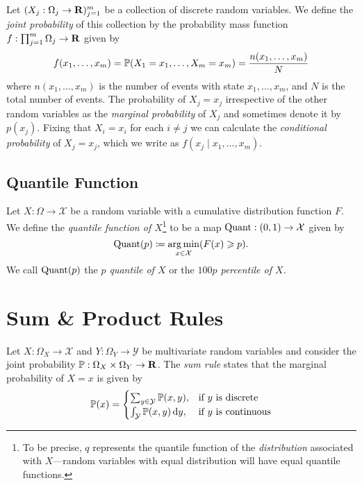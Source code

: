 \begin{definition}
    \label{def:joint-probability}
    Let \((X_j: \Omega_j \to \mathbf{R})_{j=1}^m\) be a collection of discrete random variables. We
    define the \emph{joint probability} of this collection by the probability mass
    function \(f: \prod_{j=1}^m \Omega_j \to \mathbf{R}\) given by
    \[
        f(x_1, \dots, x_m)
        = \operatorname{\mathbb{P}}(X_1 = x_1, \dots, X_m = x_m)
        = \frac{n(x_1, \dots, x_m)}{N}
    \]
    where \(n(x_1, \dots, x_m)\) is the number of events with state
    \(x_1, \dots, x_m\), and \(N\) is the total number of events. The probability of
    \(X_j = x_j\) irrespective of the other random variables as the \emph{marginal
        probability} of \(X_j\) and sometimes denote it by \(p(x_j)\). Fixing that
    \(X_i = x_i\) for each \(i \neq j\) we can calculate the \emph{conditional
        probability} of \(X_j = x_j\), which we write as
    \(f(x_j \mid x_1, \dots, x_m)\).
\end{definition}

\subsection{Quantile Function}

\begin{definition}
    \label{def:quantile-percentile}
    Let \(X: \Omega \to \mathcal{X}\) be a random variable with a cumulative
    distribution function \(F\). We define the \emph{quantile function of
        \(X\)}\footnote{To be precise, \(q\) represents the quantile function of the
        \emph{distribution} associated with \(X\)---random variables with equal
        distribution will have equal quantile functions.} to be a map
    \(\operatorname{Quant}: (0, 1) \to \mathcal{X}\) given by
    \[
        \operatorname{Quant}(p) \coloneq \operatorname*{arg\,min}_{x \in \mathcal{X}} (F(x) \geqslant p).
    \]
    We call \(\operatorname{Quant}(p)\) the \emph{\(p\) quantile of \(X\)} or the
    \emph{\(100 p\) percentile of \(X\)}.
\end{definition}

\section{Sum \& Product Rules}

\begin{lemma}
    \label{lem:joint-probability-sum-rule}
    Let \(X: \Omega_X \to \mathcal{X}\) and \(Y: \Omega_Y \to \mathcal{Y}\) be
    multivariate random variables and consider the joint probability
    \(\operatorname{\mathbb{P}}: \Omega_X \times \Omega_Y \to \mathbf{R}\). The \emph{sum rule}
    states that the marginal probability of \(X = x\) is given by
    \[
        \operatorname{\mathbb{P}}(x) =
        \begin{cases}
            \sum_{y \in \mathcal{Y}} \operatorname{\mathbb{P}}(x, y),     & \text{if } y \text{ is discrete}   \\
            \int_{\mathcal{Y}} \operatorname{\mathbb{P}}(x, y)\, \mathrm{d} y, & \text{if } y \text{ is continuous}
        \end{cases}
    \]
\end{lemma}

